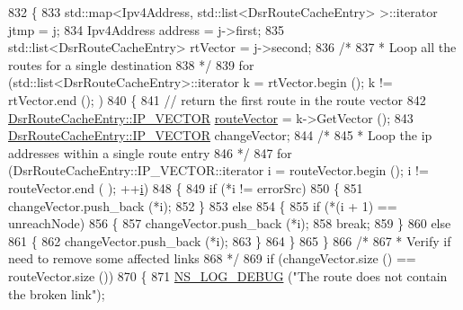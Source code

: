 \begin{DoxyCode}
832         \{
833           std::map<Ipv4Address, std::list<DsrRouteCacheEntry> >::iterator jtmp = j;
834           Ipv4Address address = j->first;
835           std::list<DsrRouteCacheEntry> rtVector = j->second;
836           \textcolor{comment}{/*}
837 \textcolor{comment}{           * Loop all the routes for a single destination}
838 \textcolor{comment}{           */}
839           \textcolor{keywordflow}{for} (std::list<DsrRouteCacheEntry>::iterator k = rtVector.begin (); k != rtVector.end (); )
840             \{
841               \textcolor{comment}{// return the first route in the route vector}
842               \hyperlink{classns3_1_1dsr_1_1DsrRouteCacheEntry_ab834177006bdbfd2e3fa607c2a88cbdf}{DsrRouteCacheEntry::IP\_VECTOR} 
      \hyperlink{classns3_1_1dsr_1_1DsrRouteCache_a055f612eb8c2e05b634db24523adb1e5}{routeVector} = k->GetVector ();
843               \hyperlink{classns3_1_1dsr_1_1DsrRouteCacheEntry_ab834177006bdbfd2e3fa607c2a88cbdf}{DsrRouteCacheEntry::IP\_VECTOR} changeVector;
844               \textcolor{comment}{/*}
845 \textcolor{comment}{               * Loop the ip addresses within a single route entry}
846 \textcolor{comment}{               */}
847               \textcolor{keywordflow}{for} (DsrRouteCacheEntry::IP\_VECTOR::iterator i = routeVector.begin (); i != routeVector.end (
      ); ++\hyperlink{bernuolliDistribution_8m_a6f6ccfcf58b31cb6412107d9d5281426}{i})
848                 \{
849                   \textcolor{keywordflow}{if} (*i != errorSrc)
850                     \{
851                       changeVector.push\_back (*i);
852                     \}
853                   \textcolor{keywordflow}{else}
854                     \{
855                       \textcolor{keywordflow}{if} (*(i + 1) == unreachNode)
856                         \{
857                           changeVector.push\_back (*i);
858                           \textcolor{keywordflow}{break};
859                         \}
860                       \textcolor{keywordflow}{else}
861                         \{
862                           changeVector.push\_back (*i);
863                         \}
864                     \}
865                 \}
866               \textcolor{comment}{/*}
867 \textcolor{comment}{               * Verify if need to remove some affected links}
868 \textcolor{comment}{               */}
869               \textcolor{keywordflow}{if} (changeVector.size () == routeVector.size ())
870                 \{
871                   \hyperlink{group__logging_ga413f1886406d49f59a6a0a89b77b4d0a}{NS\_LOG\_DEBUG} (\textcolor{stringliteral}{"The route does not contain the broken link"});

\end{DoxyCode}
